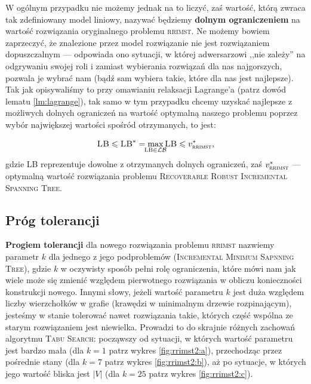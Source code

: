 W ogólnym przypadku nie możemy jednak na to liczyć, zaś wartość, którą zwraca tak zdefiniowany model liniowy, nazywać będziemy \textbf{dolnym ograniczeniem} na wartość rozwiązania oryginalnego problemu \textsc{rrimst}. Ne możemy bowiem zaprzeczyć, że znalezione przez model rozwiązanie nie jest rozwiązaniem dopuszczalnym --- odpowiada ono sytuacji, w której adwersarzowi ,,nie zależy'' na odgrywaniu swojej roli i zamiast wybierania rozwiązań dla nas najgorszych, pozwala je wybrać nam (bądź sam wybiera takie, które dla nas jest najlepsze). Tak jak opisywaliśmy to przy omawianiu relaksacji Lagrange'a (patrz dowód lematu \ref{lm:lagrange}), tak samo w tym przypadku chcemy uzyskać najlepsze z możliwych dolnych ograniczeń na wartość optymalną naszego problemu poprzez wybór największej wartości spośród otrzymanych, to jest:

\begin{equation}
\textsc{LB} \leqslant \textsc{LB}^{\ast} = \max_{\mathclap{\textsc{LB} \in \mathcal{LB}}} \textsc{LB} \leqslant v_{\textsc{rrimst}}^{\ast}\text{,}
\end{equation}
gdzie \textsc{LB} reprezentuje dowolne z otrzymanych dolnych ograniczeń, zaś $v_{\textsc{rrimst}}^{\ast}$ --- optymalną wartość rozwiązania problemu \textsc{Recoverable Robust Incremental Spanning Tree}.

\subsection{Próg tolerancji}

\textbf{Progiem tolerancji} dla nowego rozwiązania problemu \textsc{rrimst} nazwiemy parametr $k$ dla jednego z jego podproblemów (\textsc{Incremental Minimum Sapnning Tree}), gdzie $k$ w oczywisty sposób pełni rolę ograniczenia, które mówi nam jak wiele może się zmienić względem pierwotnego rozwiązania w obliczu konieczności konstrukcji nowego. Innymi słowy, jeżeli wartość parametru $k$ jest duża względem liczby wierzchołków w grafie (krawędzi w minimalnym drzewie rozpinającym), jesteśmy w stanie tolerować nawet rozwiązania takie, których część wspólna ze starym rozwiązaniem jest niewielka. Prowadzi to do skrajnie różnych zachowań algorytmu \textsc{Tabu Search}: począwszy od sytuacji, w których wartość parametru jest bardzo mała (dla $k = 1$ patrz wykres \ref{fig:rrimst2:a}), przechodząc przez pośrednie stany (dla $k = 7$ patrz wykres \ref{fig:rrimst2:b}), aż po sytuacje, w których jego wartość bliska jest $\left| V \right|$ (dla $k = 25$ patrz wykres \ref{fig:rrimst2:c}).

